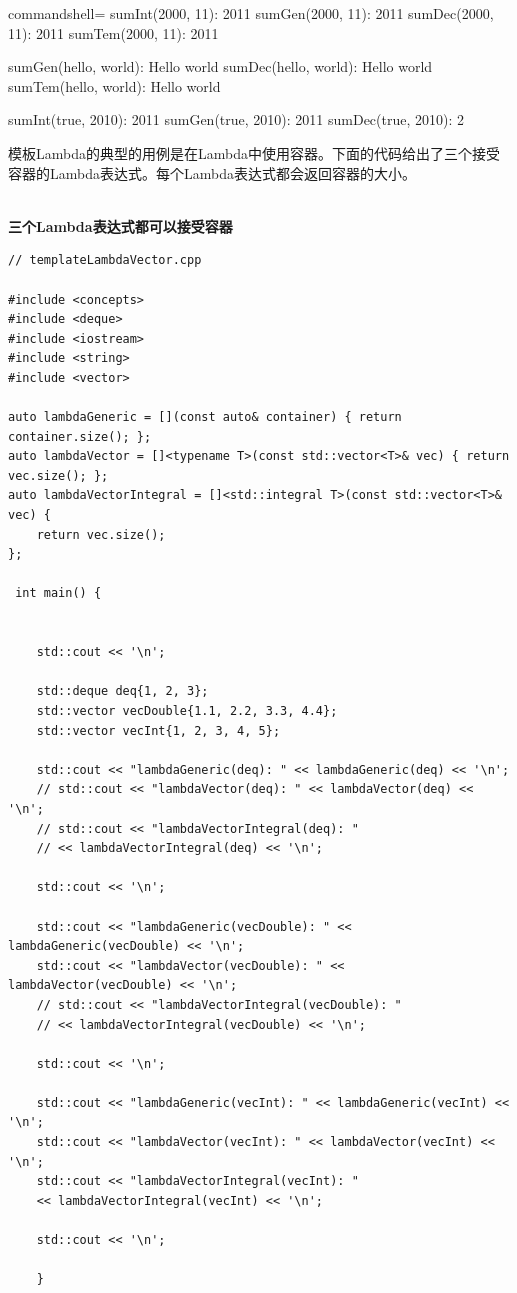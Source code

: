 \begin{tcblisting}{commandshell={}}
sumInt(2000, 11): 2011
sumGen(2000, 11): 2011
sumDec(2000, 11): 2011
sumTem(2000, 11): 2011

sumGen(hello, world): Hello world
sumDec(hello, world): Hello world
sumTem(hello, world): Hello world

sumInt(true, 2010): 2011
sumGen(true, 2010): 2011
sumDec(true, 2010): 2
\end{tcblisting}

模板Lambda的典型的用例是在Lambda中使用容器。下面的代码给出了三个接受容器的Lambda表达式。每个Lambda表达式都会返回容器的大小。

\hspace*{\fill} \\ %
\noindent
\textbf{三个Lambda表达式都可以接受容器}
\begin{lstlisting}[style=styleCXX]
// templateLambdaVector.cpp

#include <concepts>
#include <deque>
#include <iostream>
#include <string>
#include <vector>

auto lambdaGeneric = [](const auto& container) { return container.size(); };
auto lambdaVector = []<typename T>(const std::vector<T>& vec) { return vec.size(); };
auto lambdaVectorIntegral = []<std::integral T>(const std::vector<T>& vec) {
	return vec.size();
};

 int main() {
	
	
	std::cout << '\n';
	
	std::deque deq{1, 2, 3};
	std::vector vecDouble{1.1, 2.2, 3.3, 4.4};
	std::vector vecInt{1, 2, 3, 4, 5};
	
	std::cout << "lambdaGeneric(deq): " << lambdaGeneric(deq) << '\n';
	// std::cout << "lambdaVector(deq): " << lambdaVector(deq) << '\n';
	// std::cout << "lambdaVectorIntegral(deq): "
	// << lambdaVectorIntegral(deq) << '\n';
	
	std::cout << '\n';
	
	std::cout << "lambdaGeneric(vecDouble): " << lambdaGeneric(vecDouble) << '\n';
	std::cout << "lambdaVector(vecDouble): " << lambdaVector(vecDouble) << '\n';
	// std::cout << "lambdaVectorIntegral(vecDouble): "
	// << lambdaVectorIntegral(vecDouble) << '\n';
	
	std::cout << '\n';
	
	std::cout << "lambdaGeneric(vecInt): " << lambdaGeneric(vecInt) << '\n';
	std::cout << "lambdaVector(vecInt): " << lambdaVector(vecInt) << '\n';
	std::cout << "lambdaVectorIntegral(vecInt): "
	<< lambdaVectorIntegral(vecInt) << '\n';
	
	std::cout << '\n';
	
	}
\end{lstlisting}

